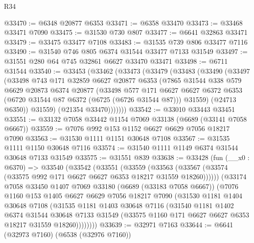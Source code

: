 \begin{lexlean}{R34}
\begin{coremodule}
@33470 := @6348 @20877 @6353
@33471 := @6358 @33470
@33473 := @33468 @33471 @7090
@33475 := @31530 @730 @807
@33477 := @6641 @32863 @33471
@33479 := @33475 @33477 @7108
@33483 := @31535 @739 @806 @33477 @7116
@33490 := @31540 @746 @805 @6374 @31544 @33477 @7133 @31549
@33497 := @31551 @280 @64 @745 @32861 @6627 @33470 @33471
@33498 := @6711 @31544
@33540 := @33453
    (@33462
      (@33473
        (@33479
          (@33483
            (@33490
              (@33497
                (@33498
                  @743
                  @171
                  @32859
                  @6627
                  @20877
                  @6353
                  (@7865
                    @31544
                    @338
                    @579
                    @6629
                    @20873
                    @6374
                    @20877
                    (@33498
                      @577
                      @171
                      @6627
                      @6627
                      @6372
                      @6353
                      (@6720 @31544 @87 @6372 (@6725 (@6726 @31544 @87)))
                      @31559)
                    (@24713 @6350))
                  @31559)
                (@21354 @33470)))))))
@33542 := @33010 @33443 @33451
@33551 := @33132 @7058 @33442 @1154 @7069 @33138 (@6689 (@33141 @7058 @6667))
@33559 := @7076 @992 @153 @1152 @6627 @6629 @7056 @18217 @7090
@33563 := @31530 @1111 @1151 @30648 @7108
@33567 := @31535 @1111 @1150 @30648 @7116
@33574 := @31540 @1111 @1149 @6374 @31544 @30648 @7133 @31549
@33575 := @31551 @839
@33638 := @33428
    (fun (__x0 : @6370) =>
    @33540
      (@33542
        (@33551
          (@33559
            (@33563 (@33567 (@33574 (@33575 @992 @171 @6627 @6627 @6353 @18217 @31559 @18260))))))
        (@33174
          @7058
          @33450
          @1407
          @7069
          @33180
          (@6689 (@33183 @7058 @6667))
          (@7076
            @1160
            @153
            @1405
            @6627
            @6629
            @7056
            @18217
            @7090
            (@31530
              @1181
              @1404
              @30648
              @7108
              (@31535
                @1181
                @1403
                @30648
                @7116
                (@31540
                  @1181
                  @1402
                  @6374
                  @31544
                  @30648
                  @7133
                  @31549
                  (@33575 @1160 @171 @6627 @6627 @6353 @18217 @31559 @18260))))))))
@33639 := @32971 @7163
@33644 := @6641 (@32973 @7160) (@6538 (@32976 @7160))

\end{coremodule}
\end{lexlean}
